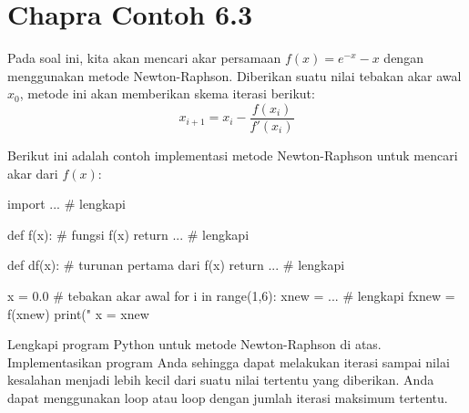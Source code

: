 \section{Chapra Contoh 6.3}
Pada soal ini, kita akan mencari akar persamaan $f(x) = e^{-x} - x$ dengan
menggunakan metode Newton-Raphson. Diberikan suatu nilai tebakan akar
awal $x_{0}$, metode ini akan memberikan skema iterasi berikut:
\begin{equation}
x_{i+1} = x_{i} - \frac{f(x_{i})}{f'(x_{i})}
\label{eq:newton_raphson_1}
\end{equation}

Berikut ini adalah contoh implementasi metode Newton-Raphson untuk
mencari akar dari $f(x)$:
\begin{pythoncode}
import ... # lengkapi

def f(x): # fungsi f(x)
    return ...  # lengkapi
    
def df(x): # turunan pertama dari f(x)
    return ... # lengkapi

x = 0.0 # tebakan akar awal
for i in range(1,6):
    xnew = ... # lengkapi
    fxnew = f(xnew)
    print("%
    x = xnew    
\end{pythoncode}

\begin{soal}
Lengkapi program Python untuk metode Newton-Raphson di atas.
Implementasikan program Anda sehingga
dapat melakukan iterasi sampai nilai kesalahan menjadi lebih kecil dari
suatu nilai tertentu yang diberikan. Anda dapat menggunakan loop 
atau loop  dengan jumlah iterasi maksimum tertentu.
\end{soal}